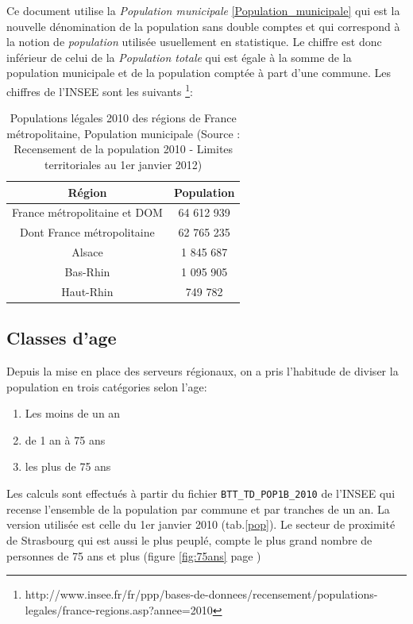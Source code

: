 \documentclass[12pt,english,french,twoside]{report}\usepackage[]{graphicx}\usepackage[]{color}
\providecommand{\tabularnewline}{\\} %
\begin{document}
Ce document utilise la \emph{Population municipale} \ref{Population_municipale}   qui est la nouvelle dénomination de la population sans double comptes et qui correspond à la notion de \emph{population} utilisée usuellement en statistique.
Le chiffre est donc inférieur de celui de la \emph{Population totale} qui est égale à la somme de la population municipale et de la population comptée à part d'une commune.
Les chiffres de l'INSEE sont les suivants \footnote{http://www.insee.fr/fr/ppp/bases-de-donnees/recensement/populations-legales/france-regions.asp?annee=2010}:

\begin{table}
\begin{center}
\begin{tabular}{|c|c|}
\hline 
Région & Population\tabularnewline
\hline 
\hline 
France métropolitaine et DOM & 64 612 939\tabularnewline
\hline 
Dont France métropolitaine & 62 765 235\tabularnewline
\hline 
Alsace & 1 845 687\tabularnewline
\hline 
Bas-Rhin & 1 095 905\tabularnewline
\hline 
Haut-Rhin & 749 782\tabularnewline
\hline 
\end{tabular}
\caption[Populations légales 2010]{Populations légales 2010 des régions de France métropolitaine, Population
municipale (Source : Recensement de la population 2010 - Limites territoriales
au 1er janvier 2012) }
\label{pop2010}
\end{center}
\end{table}

\subsection{Classes d'age}
Depuis la mise en place des serveurs régionaux, on a pris l'habitude de diviser la population en trois catégories selon l'age:
\begin{enumerate}
  \item Les moins de un an
  \item de 1 an à 75 ans
  \item les plus de 75 ans
\end{enumerate}

Les calculs sont effectués à partir du fichier \texttt{BTT\_TD\_POP1B\_2010} de l'INSEE qui recense l'ensemble de la population par commune et par tranches de un an. La version utilisée est celle du 1er janvier 2010 (tab.\ref{pop}). Le secteur de proximité de Strasbourg qui est aussi le plus peuplé, compte le plus grand nombre de personnes de 75 ans et plus (figure \ref{fig:75ans} page \pageref{fig:75ans})
\end{document}
